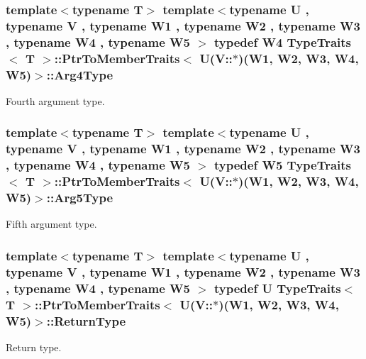 \subsubsection[{\texorpdfstring{Arg4\+Type}{Arg4Type}}]{\setlength{\rightskip}{0pt plus 5cm}template$<$typename T$>$ template$<$typename U , typename V , typename W1 , typename W2 , typename W3 , typename W4 , typename W5 $>$ typedef W4 {\bf Type\+Traits}$<$ T $>$\+::{\bf Ptr\+To\+Member\+Traits}$<$ U(V\+::$\ast$)(W1, W2, W3, W4, W5)$>$\+::{\bf Arg4\+Type}}\hypertarget{structTypeTraits_1_1PtrToMemberTraits_3_01U_07V_1_1_5_08_07W1_00_01W2_00_01W3_00_01W4_00_01W5_08_4_a068c3001efbda429abc908009c8eda9e}{}\label{structTypeTraits_1_1PtrToMemberTraits_3_01U_07V_1_1_5_08_07W1_00_01W2_00_01W3_00_01W4_00_01W5_08_4_a068c3001efbda429abc908009c8eda9e}
Fourth argument type. 
\subsubsection[{\texorpdfstring{Arg5\+Type}{Arg5Type}}]{\setlength{\rightskip}{0pt plus 5cm}template$<$typename T$>$ template$<$typename U , typename V , typename W1 , typename W2 , typename W3 , typename W4 , typename W5 $>$ typedef W5 {\bf Type\+Traits}$<$ T $>$\+::{\bf Ptr\+To\+Member\+Traits}$<$ U(V\+::$\ast$)(W1, W2, W3, W4, W5)$>$\+::{\bf Arg5\+Type}}\hypertarget{structTypeTraits_1_1PtrToMemberTraits_3_01U_07V_1_1_5_08_07W1_00_01W2_00_01W3_00_01W4_00_01W5_08_4_a59b9d5f46510a26913a3a2a579c4a492}{}\label{structTypeTraits_1_1PtrToMemberTraits_3_01U_07V_1_1_5_08_07W1_00_01W2_00_01W3_00_01W4_00_01W5_08_4_a59b9d5f46510a26913a3a2a579c4a492}
Fifth argument type. 
\subsubsection[{\texorpdfstring{Return\+Type}{ReturnType}}]{\setlength{\rightskip}{0pt plus 5cm}template$<$typename T$>$ template$<$typename U , typename V , typename W1 , typename W2 , typename W3 , typename W4 , typename W5 $>$ typedef U {\bf Type\+Traits}$<$ T $>$\+::{\bf Ptr\+To\+Member\+Traits}$<$ U(V\+::$\ast$)(W1, W2, W3, W4, W5)$>$\+::{\bf Return\+Type}}\hypertarget{structTypeTraits_1_1PtrToMemberTraits_3_01U_07V_1_1_5_08_07W1_00_01W2_00_01W3_00_01W4_00_01W5_08_4_adaa14f30f7b66ec1134a0e96798b1b8a}{}\label{structTypeTraits_1_1PtrToMemberTraits_3_01U_07V_1_1_5_08_07W1_00_01W2_00_01W3_00_01W4_00_01W5_08_4_adaa14f30f7b66ec1134a0e96798b1b8a}
Return type. 

